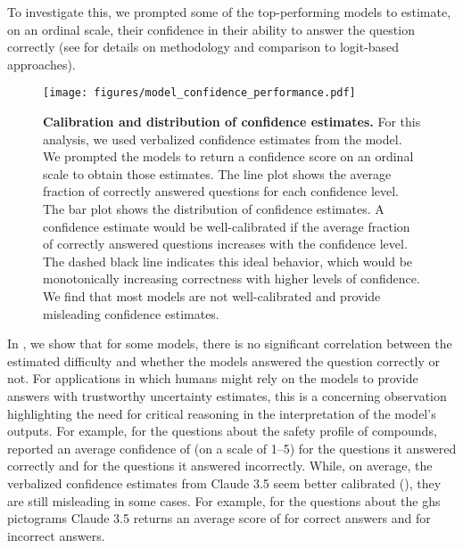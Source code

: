\documentclass[11pt, oneside]{article}
\begin{document}
\begin{refsection}
To investigate this, we prompted\autocite{xiong2023llms} some of the top-performing models to estimate, on an ordinal scale, their confidence in their ability to answer the question correctly (see  for details on methodology and comparison to logit-based approaches).

 \begin{figure}[!h]
     \centering
     \texttt{[image: figures/model\_confidence\_performance.pdf]}
     \caption{\textbf{Calibration and distribution of confidence estimates.} For this analysis, we used verbalized confidence estimates from the model. We prompted the models to return a confidence score on an ordinal scale to obtain those estimates.
     The line plot shows the average fraction of correctly answered questions for each confidence level. The bar plot shows the distribution of confidence estimates.
     A confidence estimate would be well-calibrated if the average fraction of correctly answered questions increases with the confidence level.      The dashed black line indicates this ideal behavior, which would be monotonically increasing correctness with higher
     levels of confidence.
     We find that most models are not well-calibrated and provide misleading confidence estimates.
     }
     \label{fig:confidence_vs_performance}
 \end{figure}

 In , we show that for some models, there is no significant correlation between the estimated difficulty and whether the models answered the question correctly or not.
 For applications in which humans might rely on the models to provide answers with trustworthy uncertainty estimates, this is a concerning observation highlighting the need for critical reasoning in the interpretation of the model's outputs.\autocite{Li_2023, miret2024llms}
 For example, for the questions about the safety profile of compounds, \GPTFour reported an average confidence of  (on a scale of 1--5) for the  questions it answered correctly and  for the  questions it answered incorrectly.
 While, on average, the verbalized confidence estimates from Claude 3.5 seem better calibrated (), they are still misleading in some cases.
 For example, for the questions about the \gls{ghs} pictograms Claude 3.5 returns an average score of  for correct answers and  for incorrect answers.


\end{refsection}
\end{document}
